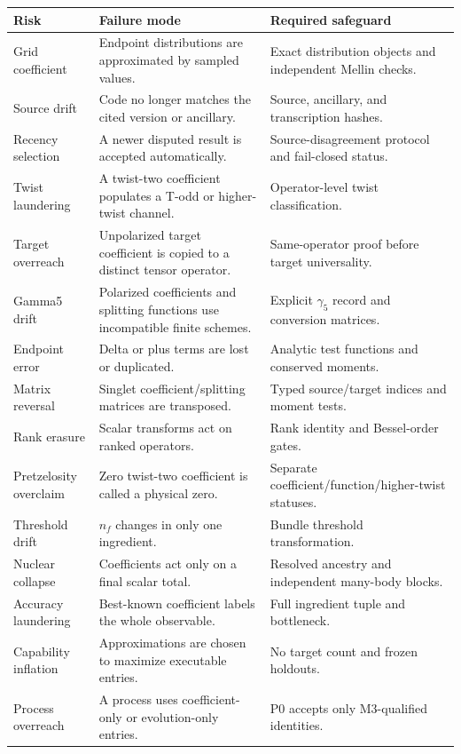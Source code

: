\documentclass[11pt]{article}
\begin{document}
\begin{longtable}{L{0.20\textwidth}L{0.32\textwidth}L{0.40\textwidth}}
\toprule
Risk & Failure mode & Required safeguard\\
\midrule
\endhead
Grid coefficient & Endpoint distributions are approximated by sampled values. & Exact distribution objects and independent Mellin checks.\\
Source drift & Code no longer matches the cited version or ancillary. & Source, ancillary, and transcription hashes.\\
Recency selection & A newer disputed result is accepted automatically. & Source-disagreement protocol and fail-closed status.\\
Twist laundering & A twist-two coefficient populates a T-odd or higher-twist channel. & Operator-level twist classification.\\
Target overreach & Unpolarized target coefficient is copied to a distinct tensor operator. & Same-operator proof before target universality.\\
Gamma5 drift & Polarized coefficients and splitting functions use incompatible finite schemes. & Explicit \(\gamma_5\) record and conversion matrices.\\
Endpoint error & Delta or plus terms are lost or duplicated. & Analytic test functions and conserved moments.\\
Matrix reversal & Singlet coefficient/splitting matrices are transposed. & Typed source/target indices and moment tests.\\
Rank erasure & Scalar transforms act on ranked operators. & Rank identity and Bessel-order gates.\\
Pretzelosity overclaim & Zero twist-two coefficient is called a physical zero. & Separate coefficient/function/higher-twist statuses.\\
Threshold drift & \(n_f\) changes in only one ingredient. & Bundle threshold transformation.\\
Nuclear collapse & Coefficients act only on a final scalar total. & Resolved ancestry and independent many-body blocks.\\
Accuracy laundering & Best-known coefficient labels the whole observable. & Full ingredient tuple and bottleneck.\\
Capability inflation & Approximations are chosen to maximize executable entries. & No target count and frozen holdouts.\\
Process overreach & A process uses coefficient-only or evolution-only entries. & P0 accepts only M3-qualified identities.\\
\bottomrule
\end{longtable}
\end{document}
